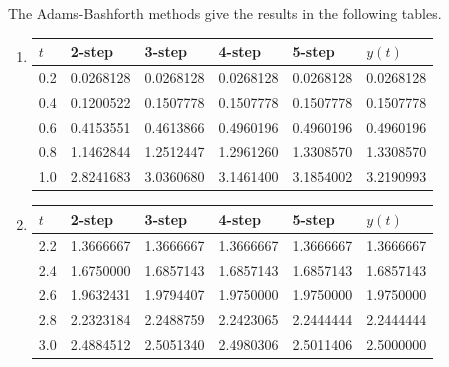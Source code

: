 \begin{myexercise}
\begin{mysolution}
The Adams-Bashforth methods give the results in the following tables.\\
\begin{enumerate}[label=(\alph*)]
\item
\begin{center}
\begin{tabular}{|l|l|l|l|l|l|}
\hline
$t$ & 2-step & 3-step & 4-step & 5-step & $y(t)$ \\
\hline
0.2 & 0.0268128 & 0.0268128 & 0.0268128 & 0.0268128 & 0.0268128 \\
\hline
0.4 & 0.1200522 & 0.1507778 & 0.1507778 & 0.1507778 & 0.1507778 \\
\hline
0.6 & 0.4153551 & 0.4613866 & 0.4960196 & 0.4960196 & 0.4960196 \\
\hline
0.8 & 1.1462844 & 1.2512447 & 1.2961260 & 1.3308570 & 1.3308570 \\
\hline
1.0 & 2.8241683 & 3.0360680 & 3.1461400 & 3.1854002 & 3.2190993 \\
\hline
\end{tabular}
\end{center}
\item
\begin{center}
\begin{tabular}{|l|l|l|l|l|l|}
\hline
$t$ & 2-step & 3-step & 4-step & 5-step & $y(t)$ \\
\hline
2.2 & 1.3666667 & 1.3666667 & 1.3666667 & 1.3666667 & 1.3666667 \\
\hline
2.4 & 1.6750000 & 1.6857143 & 1.6857143 & 1.6857143 & 1.6857143 \\
\hline
2.6 & 1.9632431 & 1.9794407 & 1.9750000 & 1.9750000 & 1.9750000 \\
\hline
2.8 & 2.2323184 & 2.2488759 & 2.2423065 & 2.2444444 & 2.2444444 \\
\hline
3.0 & 2.4884512 & 2.5051340 & 2.4980306 & 2.5011406 & 2.5000000 \\
\hline
\end{tabular}
\end{center}

\end{enumerate}
\end{mysolution}
\end{myexercise}
